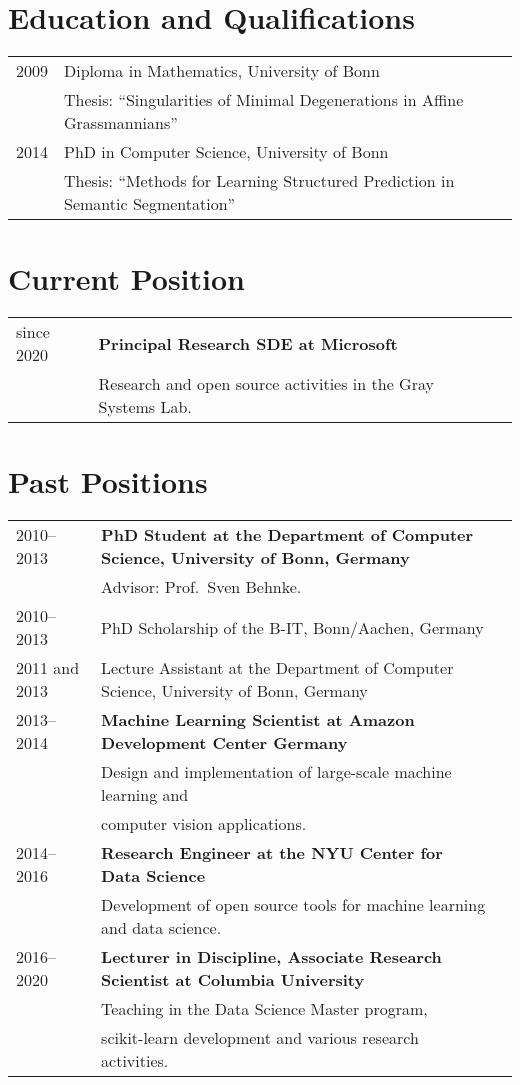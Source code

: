 \documentclass[a4paper,11pt]{article}
\begin{document}
\maketitle

\section{Education and Qualifications}
\begin{tabular}{lll}
    2009 & Diploma in Mathematics,  University of Bonn\\
         & Thesis: ``Singularities of Minimal Degenerations in Affine Grassmannians'' \\
    2014 & PhD in Computer Science, University of Bonn \\
         & Thesis: ``Methods for Learning Structured Prediction in Semantic Segmentation''
\end{tabular}

\section{Current Position}
\begin{tabular}{lll}
    since 2020 & \textbf{Principal Research SDE at Microsoft}\\
               & Research and open source activities in the Gray Systems Lab.
\end{tabular}

\section{Past Positions}
\begin{tabular}{lll}
    2010--2013 & \textbf{PhD Student at the Department of Computer Science, University of Bonn, Germany}\\
         & Advisor: Prof.\ Sven Behnke. \\
    2010--2013 & PhD Scholarship of the B-IT, Bonn/Aachen, Germany\\
    2011 and 2013& Lecture Assistant at the Department of Computer Science, University of Bonn, Germany \\
    2013--2014 & \textbf{Machine Learning Scientist at Amazon Development Center Germany}\\
              & Design and implementation of large-scale machine learning and\\
              & computer vision applications.\\
    2014--2016 & \textbf{Research Engineer at the NYU Center for Data Science}\\
               & Development of open source tools for machine learning and data science.\\
    2016--2020 & \textbf{Lecturer in Discipline, Associate Research Scientist at Columbia University}\\
               & Teaching in the Data Science Master program, \\
               & scikit-learn development and various research activities.
\end{tabular}
\end{document}
